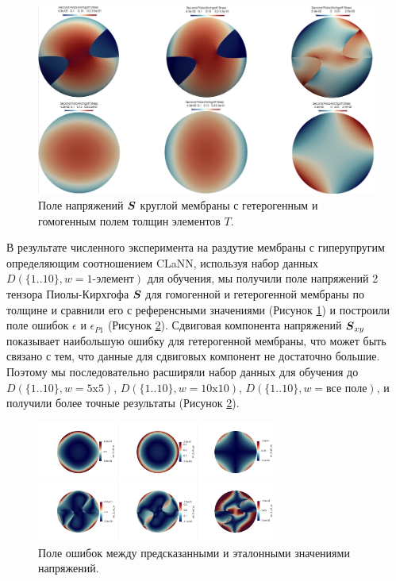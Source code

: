   \begin{figure}[H]
    \centering
    \includegraphics[width=1.0\textwidth]{img/Numerical/ref_stress.png}
    \caption{Поле напряжений $\boldsymbol{S}$ круглой мембраны с гетерогенным и гомогенным полем толщин элементов $T$.}
    \label{fig:numerical_experiment}
  \end{figure}
  
  В результате численного эксперимента на раздутие мембраны с гиперупругим определяющим соотношением CLaNN,
  используя набор данных $D (\{1..10\}, w=\text{1-элемент})$ для обучения, мы получили поле напряжений 2 тензора Пиолы-Кирхгофа 
  $\boldsymbol{S}$ для гомогенной и гетерогенной мембраны по толщине и сравнили его
  с референсными значениями (Рисунок \ref{fig:numerical_experiment}) и построили поле ошибок $\epsilon$ и $\epsilon_{P1}$ (Рисунок \ref{fig:numerical_errors}).
  Сдвиговая компонента напряжений $\boldsymbol{S}_{xy}$ показывает наибольшую ошибку для гетерогенной мембраны, 
  что может быть связано с тем, что данные для сдвиговых компонент не достаточно большие. Поэтому мы последовательно 
  расширяли набор данных для обучения до $D (\{1..10\}, w=\text{5x5})$, $D (\{1..10\}, w=\text{10x10})$, $D (\{1..10\}, w=\text{все поле})$, 
  и получили более точные результаты (Рисунок \ref{fig:numerical_errors}).

  \begin{figure}[H]
    \centering
    \includegraphics[width=0.7\textwidth]{img/Numerical/errs.png}
    \caption{Поле ошибок между предсказанными и эталонными значениями напряжений.}
    \label{fig:numerical_errors}
  \end{figure}
  



